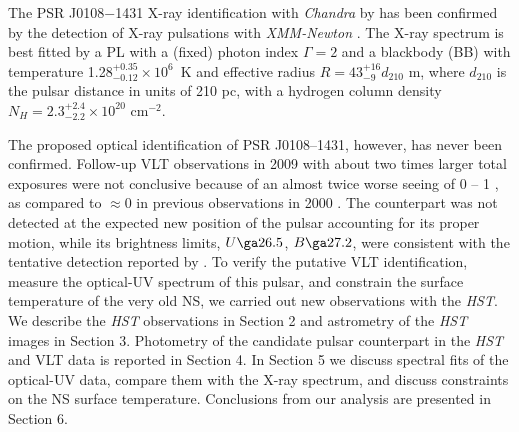 \documentclass[pdftex,twocolumn]{aastex62}
\begin{document}
The PSR J0108$-$1431 X-ray identification with {\sl Chandra} by 
\citet{2009pavlov} %
has been confirmed by the detection of X-ray pulsations with {\sl XMM-Newton} \citep{Posselt2012}. 
The X-ray spectrum is best fitted by a PL with a (fixed) photon index $\Gamma  = 2$ and a blackbody (BB) with temperature 
1.28$^{+0.35}_{-0.12}\times 10^6$~K and effective radius 
$R= 43^{+16}_{-9} d_{210}$ m, where $d_{210}$ is the pulsar distance in units of 210 pc, with a hydrogen column density $N_H=2.3^{+2.4}_{-2.2}\times 10^{20}$ cm$^{-2}$.

The proposed optical identification of PSR J0108--1431, however, has never been confirmed. Follow-up VLT observations in 2009 with about two times larger total exposures were not conclusive 
because of an almost twice worse seeing  of 0 -- 1 \citep{Mignani2011},  
as compared to  $\approx$0 
in previous  observations in 2000 %
 \citep{Mignani2003}.  The counterpart was not detected at the expected new position  of the pulsar accounting for its proper motion, while its  brightness limits,  $U\ga 26.5$, $B\ga 27.2$, were consistent with the tentative detection reported  by \citet{Mignani2008}. 
To verify the putative VLT identification, measure the optical-UV spectrum of this pulsar, and constrain the surface temperature of the very old NS, 
we carried out new observations with the {\sl HST}. We describe the {\sl HST} observations in Section 2 and astrometry of the {\sl HST} images in Section 3.
Photometry of the candidate pulsar counterpart in the {\sl HST} and VLT data is reported in Section 4.
In Section 5 we discuss spectral fits of the optical-UV data, compare them with the X-ray spectrum, and discuss constraints on the NS surface temperature. Conclusions from our analysis are presented in Section 6.

\end{document}
